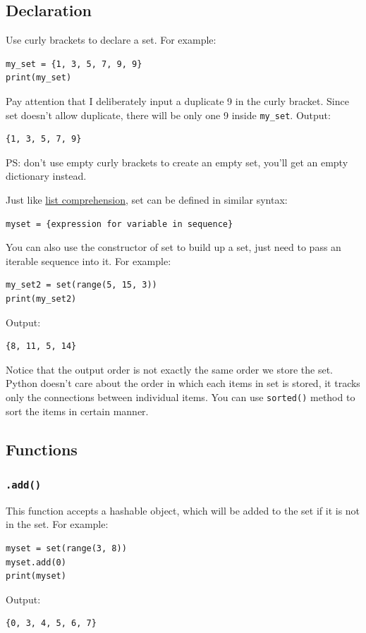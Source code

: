 \documentclass[12pt]{book}
\begin{document}
\subsection{Declaration}
\label{sec:org8a36a81}
Use curly brackets to declare a set. For example:
\begin{verbatim}
my_set = {1, 3, 5, 7, 9, 9}
print(my_set)
\end{verbatim}
Pay attention that I deliberately input a duplicate 9 in the curly bracket. Since set doesn't allow duplicate, there will be only one 9 inside \texttt{my\_set}. Output:
\begin{verbatim}
{1, 3, 5, 7, 9}
\end{verbatim}
PS: don't use empty curly brackets to create an empty set, you'll get an empty dictionary instead.

Just like \hyperref[org9cb9ef6]{list comprehension}, set can be defined in similar syntax:
\begin{verbatim}
myset = {expression for variable in sequence}
\end{verbatim}

You can also use the constructor of set to build up a set, just need to pass an iterable sequence into it. For example:
\begin{verbatim}
my_set2 = set(range(5, 15, 3))
print(my_set2)
\end{verbatim}
Output:
\begin{verbatim}
{8, 11, 5, 14}
\end{verbatim}
Notice that the output order is not exactly the same order we store the set. Python doesn't care about the order in which each items in set is stored, it tracks only the connections between individual items. You can use \texttt{sorted()} method to sort the items in certain manner.
\subsection{Functions}
\label{sec:org7630f07}
\subsubsection{\texttt{.add()}}
\label{sec:org997c8d2}
This function accepts a hashable object, which will be added to the set if it is not in the set. For example:
\begin{verbatim}
myset = set(range(3, 8))
myset.add(0)
print(myset)
\end{verbatim}
Output:
\begin{verbatim}
{0, 3, 4, 5, 6, 7}
\end{verbatim}
\end{document}
